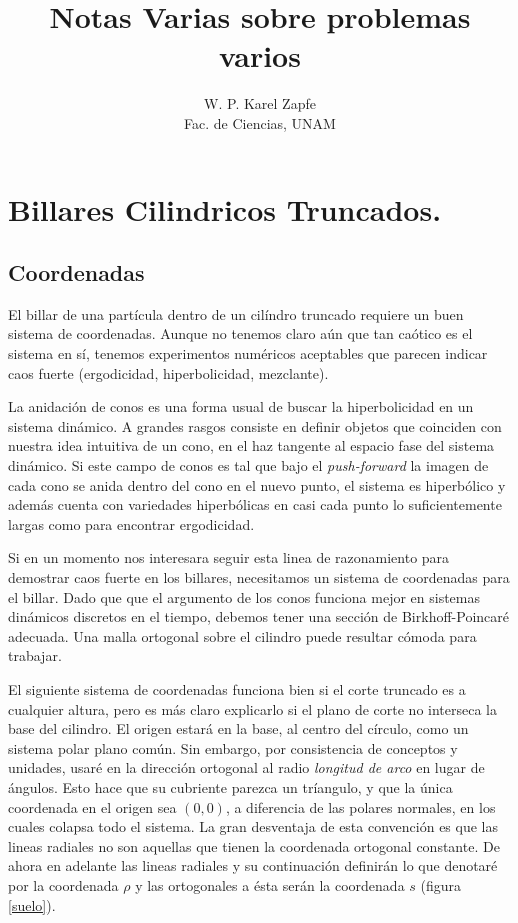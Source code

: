 \documentclass[letterpaper,10pt]{article}
\title{Notas Varias sobre problemas varios}
\author{ W. P. Karel Zapfe\\Fac. de Ciencias, UNAM}
\begin{document}
\section{Billares Cilindricos Truncados.}

\subsection{Coordenadas}
El billar de una partícula dentro de un cilíndro truncado
requiere un buen sistema de coordenadas. Aunque no tenemos claro
aún que tan caótico es el sistema en sí, tenemos experimentos numéricos
aceptables que parecen indicar  caos fuerte (ergodicidad, hiperbolicidad,
mezclante).

La anidación de conos es una forma usual
de buscar la hiperbolicidad en un sistema dinámico.
A grandes rasgos consiste en definir objetos que
coinciden con nuestra idea intuitiva de un cono, en el haz tangente
al espacio fase del sistema dinámico. Si este campo de conos es
tal que bajo el \emph{push-forward} la imagen de cada cono se anida dentro
del cono en el nuevo punto, el sistema es hiperbólico y además cuenta
con variedades hiperbólicas en casi cada punto lo suficientemente
largas como para encontrar ergodicidad.

Si en un momento nos interesara seguir esta linea de razonamiento
para demostrar caos fuerte en los billares, necesitamos
un sistema de coordenadas para el billar. Dado que que el argumento
de los conos funciona mejor en sistemas dinámicos discretos en el tiempo,
debemos tener una sección de Birkhoff-Poincaré adecuada.
Una malla ortogonal sobre el 
cilindro puede resultar cómoda para trabajar. 

El siguiente sistema de coordenadas funciona bien 
si el corte truncado es a cualquier
altura, pero es más claro explicarlo si el plano de corte no
interseca la base del cilindro. El origen estará en la base, al centro
del círculo, como un sistema polar plano común. Sin embargo,
por consistencia de conceptos y unidades, usaré en la dirección 
ortogonal al radio  \emph{longitud de arco} en lugar de ángulos.
Esto hace que su cubriente parezca un tríangulo, y que la única
coordenada en el origen sea $(0,0)$, a diferencia de las polares normales,
en los cuales colapsa todo el sistema. La gran desventaja de
esta convención es que las lineas radiales no son aquellas que tienen
la coordenada ortogonal constante. De ahora en adelante las lineas radiales
y su continuación definirán lo que denotaré por la coordenada $\rho$ y
las ortogonales a ésta serán la coordenada $s$ (figura \ref{suelo}).
\end{document}
